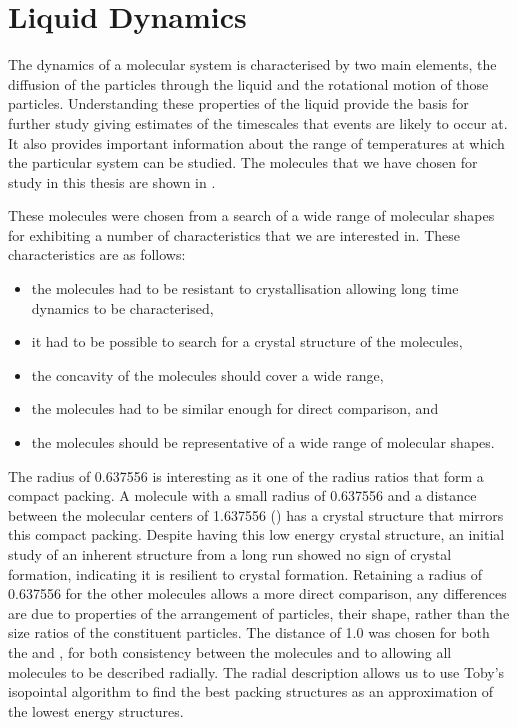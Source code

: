 \chapter{Liquid Dynamics}

The dynamics of a molecular system is characterised by two main elements, the diffusion of the particles through the liquid and the rotational motion of those particles. Understanding these properties of the liquid provide the basis for further study giving estimates of the timescales that events are likely to occur at. It also provides important information about the range of temperatures at which the particular system can be studied. The molecules that we have chosen for study in this thesis are shown in . 

These molecules were chosen from a search of a wide range of molecular shapes for exhibiting a number of characteristics that we are interested in. These characteristics are as follows: 
\begin{itemize}
    \item the molecules had to be resistant to crystallisation allowing long time dynamics to be characterised,
    \item it had to be possible to search for a crystal structure of the molecules,
    \item the concavity of the molecules should cover a wide range,
    \item the molecules had to be similar enough for direct comparison, and
    \item the molecules should be representative of a wide range of molecular shapes.
\end{itemize}
The radius of 0.637556 is interesting as it one of the radius ratios that form a compact packing. A molecule with a small radius of 0.637556 and a distance between the molecular centers of 1.637556 (\scon) has a crystal structure that mirrors this compact packing. Despite \scon having this low energy crystal structure, an initial study of an inherent structure from a long run showed no sign of crystal formation, indicating it is resilient to crystal formation. Retaining a radius of 0.637556 for the other molecules allows a more direct comparison, any differences are due to properties of the arrangement of particles, their shape, rather than the size ratios of the constituent particles. The distance of 1.0 was chosen for both the \tri and \sone, for both consistency between the molecules and to allowing all molecules to be described radially. The radial description allows us to use Toby's isopointal algorithm to find the best packing structures as an approximation of the lowest energy structures.

